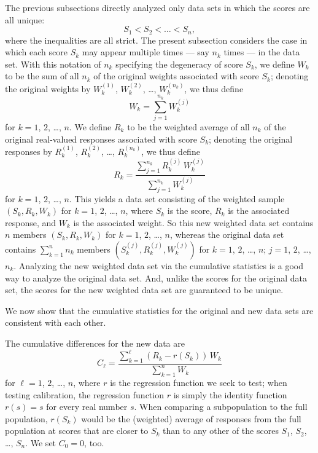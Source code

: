 \documentclass[12pt]{article}
\begin{document}
The previous subsections directly analyzed only data sets in which the scores
are all unique:
%
\begin{equation}
\label{unique}
S_1 < S_2 < \dots < S_n,
\end{equation}
%
where the inequalities are all strict.
The present subsection considers the case in which each score $S_k$
may appear multiple times --- say $n_k$ times --- in the data set.
With this notation of $n_k$ specifying the degeneracy of score $S_k$,
we define $W_k$ to be the sum of all $n_k$ of the original weights
associated with score $S_k$; denoting the original weights
by $W_k^{(1)}$, $W_k^{(2)}$, \dots, $W_k^{(n_k)}$, we thus define
%
\begin{equation}
\label{newweight}
W_k = \sum_{j=1}^{n_k} W_k^{(j)}
\end{equation}
%
for $k = 1$, $2$, \dots, $n$.
We define $R_k$ to be the weighted average
of all $n_k$ of the original real-valued responses associated with score $S_k$;
denoting the original responses
by $R_k^{(1)}$, $R_k^{(2)}$, \dots, $R_k^{(n_k)}$, we thus define
%
\begin{equation}
R_k = \frac{\sum_{j=1}^{n_k} R_k^{(j)} \, W_k^{(j)}}
           {\sum_{j=1}^{n_k} W_k^{(j)}}
\end{equation}
%
for $k = 1$, $2$, \dots, $n$.
This yields a data set consisting of the weighted sample
$(S_k, R_k, W_k)$ for $k = 1$, $2$, \dots, $n$,
where $S_k$ is the score, $R_k$ is the associated response,
and $W_k$ is the associated weight.
So this new weighted data set contains $n$ members
$(S_k, R_k, W_k)$ for $k = 1$, $2$, \dots, $n$,
whereas the original data set contains $\sum_{k=1}^n n_k$ members
$(S_k^{(j)}, R_k^{(j)}, W_k^{(j)})$ for $k = 1$, $2$, \dots, $n$;
$j = 1$, $2$, \dots, $n_k$.
Analyzing the new weighted data set via the cumulative statistics
is a good way to analyze the original data set.
And, unlike the scores for the original data set,
the scores for the new weighted data set are guaranteed to be unique.

We now show that the cumulative statistics for the original and new data sets
are consistent with each other.

The cumulative differences for the new data are
%
\begin{equation}
\label{newcumdiffs}
C_{\ell} = \frac{\sum_{k=1}^{\ell} (R_k - r(S_k)) \, W_k}{\sum_{k=1}^n W_k}
\end{equation}
%
for $\ell = 1$, $2$, \dots, $n$,
where $r$ is the regression function we seek to test;
when testing calibration, the regression function $r$
is simply the identity function $r(s) = s$ for every real number $s$.
When comparing a subpopulation to the full population,
$r(S_k)$ would be the (weighted) average of responses
from the full population at scores that are closer to $S_k$
than to any other of the scores $S_1$, $S_2$, \dots, $S_n$.
We set $C_0 = 0$, too. 
\end{document}
